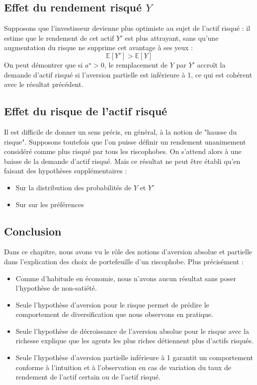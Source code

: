 \documentclass[a4paper, 12pt]{report}
\begin{document}
\subsection{Effet du rendement risqué \( Y \)}

Supposons que l'investisseur devienne plus optimiste au sujet de l'actif risqué : il estime que le rendement de cet actif \(Y'\) est plus attrayant, sans qu'une augmentation du risque ne supprime cet avantage à ses yeux :
\[
\mathbb{E}[Y'] > \mathbb{E}[Y]
\]
On peut démontrer que si \(a^\star > 0\), le remplacement de \(Y\) par \(Y'\) accroît la demande d'actif risqué si l'aversion partielle est inférieure à 1, ce qui est cohérent avec le résultat précédent.

\subsection{Effet du risque de l'actif risqué}

Il est difficile de donner un sens précis, en général, à la notion de "hausse du risque". Supposons toutefois que l'on puisse définir un rendement unanimement considéré comme plus risqué par tous les riscophobes. On s'attend alors à une baisse de la demande d'actif risqué. Mais ce résultat ne peut être établi qu'en faisant des hypothèses supplémentaires :

\begin{itemize}
	\item Sur la distribution des probabilités de \(Y\) et \(Y'\)
	\item Sur sur les préférences
\end{itemize}

\subsection{Conclusion}

Dans ce chapitre, nous avons vu le rôle des notions d'aversion absolue et partielle dans l'explication des choix de portefeuille d'un riscophobe. Plus précisément :

\begin{itemize}
	\item Comme d'habitude en économie, nous n'avons aucun résultat sans poser l'hypothèse de non-satiété.
	\item Seule l'hypothèse d'aversion pour le risque permet de prédire le comportement de diversification que nous observons en pratique.
	\item Seule l'hypothèse de décroissance de l'aversion absolue pour le risque avec la richesse explique que les agents les plus riches détiennent plus d'actifs risqués.
	\item Seule l'hypothèse d'aversion partielle inférieure à 1 garantit un comportement conforme à l'intuition et à l'observation en cas de variation du taux de rendement de l'actif certain ou de l'actif risqué.
\end{itemize}
\end{document}
